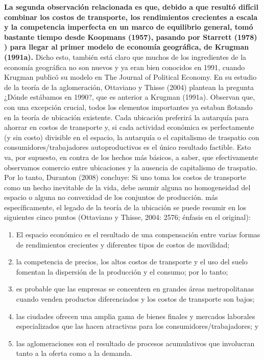 \textbf{La segunda observación relacionada es que, debido a que resultó difícil combinar los costos de transporte, los rendimientos crecientes a escala y la competencia imperfecta en un marco de equilibrio general, tomó bastante tiempo desde Koopmans (1957), pasando por Starrett (1978) ) para llegar al primer modelo de economía geográfica, de Krugman (1991a).} Dicho esto, también está claro que muchos de los ingredientes de la economía geográfica no son nuevos y ya eran bien conocidos en 1991, cuando Krugman publicó su modelo en The Journal of Political Economy. En su estudio de la teoría de la aglomeración, Ottaviano y Thisse (2004) plantean la pregunta ¿Dónde estábamos en 1990?, que es anterior a Krugman (1991a). Observan que, con una excepción crucial, todos los elementos importantes ya estaban flotando en la teoría de ubicación existente. Cada ubicación preferirá la autarquía para ahorrar en costos de transporte y, si cada actividad económica es perfectamente (y sin costo) divisible en el espacio, la autarquía o el capitalismo de traspatio con consumidores/trabajadores autoproductivos es el único resultado factible. Esto va, por supuesto, en contra de los hechos más básicos, a saber, que efectivamente observamos comercio entre ubicaciones y la ausencia de capitalismo de traspatio. Por lo tanto, Duranton (2008) concluye: Si uno toma los costos de transporte como un hecho inevitable de la vida, debe asumir alguna no homogeneidad del espacio o alguna no convexidad de los conjuntos de producción. más específicamente, el legado de la teoría de la ubicación se puede resumir en los siguientes cinco puntos (Ottaviano y Thisse, 2004: 2576; énfasis en el original):

\begin{enumerate}[\bfseries (i)]
    \item El espacio económico es el resultado de una compensación entre varias formas de rendimientos crecientes y diferentes tipos de costos de movilidad;
    \item la competencia de precios, los altos costos de transporte y el uso del suelo fomentan la dispersión de la producción y el consumo; por lo tanto;
    \item es probable que las empresas se concentren en grandes áreas metropolitanas cuando venden productos diferenciados y los costos de transporte son bajos; 
    \item las ciudades ofrecen una amplia gama de bienes finales y mercados laborales especializados que las hacen atractivas para los consumidores/trabajadores; y
    \item las aglomeraciones son el resultado de procesos acumulativos que involucran tanto a la oferta como a la demanda.
\end{enumerate}


